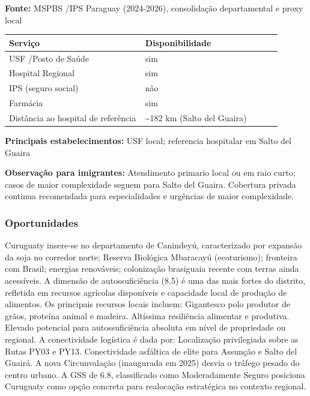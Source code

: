 \textbf{Fonte:} MSPBS /\allowbreak  IPS Paraguay (2024-2026), consolidação
departamental e proxy local

{\def\LTcaptype{none} %
\begin{longtable}{@{}>{\raggedright\arraybackslash}p{0.45\linewidth} >{\raggedright\arraybackslash}p{0.45\linewidth}@{}}
\toprule\noalign{}
Serviço & Disponibilidade \\
\midrule\noalign{}
\endhead
\bottomrule\noalign{}
\endlastfoot
USF /\allowbreak  Posto de Saúde & sim \\
Hospital Regional & sim \\
IPS (seguro social) & não \\
Farmácia & sim \\
Distância ao hospital de referência & \textasciitilde182 km (Salto del
Guaira) \\
\end{longtable}
}

\textbf{Principais estabelecimentos:} USF local; referencia hospitalar
em Salto del Guaira

\textbf{Observação para imigrantes:} Atendimento primario local ou em
raio curto; casos de maior complexidade seguem para Salto del Guaira.
Cobertura privada continua recomendada para especialidades e urgências
de maior complexidade.
\newpage

\subsubsection*{Oportunidades}\label{oport-curuguaty-1407}
Curuguaty insere-se no departamento de Canindeyú, caracterizado por expansão da soja no corredor norte; Reserva Biológica Mbaracayú (ecoturismo); fronteira com Brasil; energias renováveis; colonização brasiguaia recente com terras ainda acessíveis. A dimensão de autossuficiência (8.5) é uma das mais fortes do distrito, refletida em recursos agrícolas disponíveis e capacidade local de produção de alimentos. Os principais recursos locais incluem: Gigantesco polo produtor de grãos, proteína animal e madeira. Altíssima resiliência alimentar e produtiva. Elevado potencial para autossuficiência absoluta em nível de propriedade ou regional. A conectividade logística é dada por: Localização privilegiada sobre as Rutas PY03 e PY13. Conectividade asfáltica de elite para Assunção e Salto del Guairá. A nova Circunvalação (inaugurada em 2025) desvia o tráfego pesado do centro urbano. A GSS de 6.8, classificado como Moderadamente Seguro posiciona Curuguaty como opção concreta para realocação estratégica no contexto regional.

